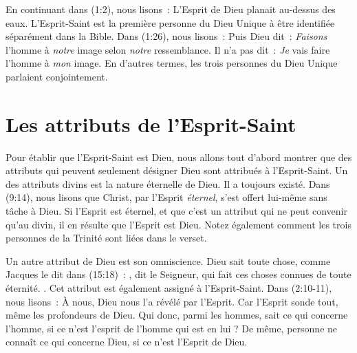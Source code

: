En continuant dans (1:2), nous lisons~:
 \og L'Esprit de Dieu planait au-dessus des eaux. \fg{}
 L'Esprit-Saint est la première personne du Dieu Unique à être identifiée
 séparément dans la Bible.
 Dans (1:26), nous lisons~:
 \og Puis Dieu dit~: \emph{Faisons} l'homme à \emph{notre} image
 selon \emph{notre} ressemblance. \fg{}
 Il n'a pas dit~: \og \emph{Je} vais faire l'homme à \emph{mon} image. \fg{}
 En d'autres termes, les trois personnes du Dieu Unique parlaient conjointement.

\section{Les attributs de l'Esprit-Saint}

Pour établir que l'Esprit-Saint est Dieu, nous allons tout d'abord montrer
 que des attributs qui peuvent seulement désigner Dieu sont attribués à
 l'Esprit-Saint.
 Un des attributs divins est la nature éternelle de Dieu.
 Il a toujours existé. Dans (9:14), nous lisons que Christ,
 par l'Esprit \emph{éternel}, s'est offert lui-même sans tâche à Dieu.
 Si l'Esprit est éternel, et que c'est un attribut qui ne peut convenir
 qu'au divin, il en résulte que l'Esprit est Dieu.
 Notez également comment les trois personnes de la Trinité sont liées
 dans le verset.

Un autre attribut de Dieu est son omniscience. Dieu sait toute chose, comme
 Jacques le dit dans (15:18)~:
 \og [\dots{}], dit le Seigneur, qui fait ces choses connues de toute éternité. \fg{}
 .
 Cet attribut est également assigné à
 l'Esprit-Saint. Dans (2:10-11), nous lisons~: \og À nous, Dieu
 nous l'a révélé par l'Esprit. Car l'Esprit sonde tout, même les profondeurs de
 Dieu. Qui donc, parmi les hommes, sait ce qui concerne l'homme, si ce n'est
 l'esprit de l'homme qui est en lui ? De même, personne ne connaît ce qui
 concerne Dieu, si ce n'est l'Esprit de Dieu. \fg{}

